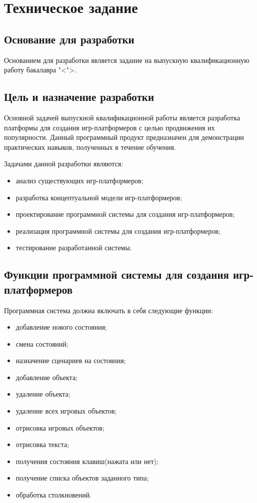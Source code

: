 \section{Техническое задание}
\subsection{Основание для разработки}

Основанием для разработки является задание на выпускную квалификационную работу бакалавра "< ">.

\subsection{Цель и назначение разработки}

Основной задачей выпускной квалификационной работы является разработка платформы для создания игр-платформеров с целью продвижения их популярности. Данный программный продукт предназначен для демонстрации практических навыков, полученных в течение обучения.

Задачами данной разработки являются:
\begin{itemize}
\item анализ существующих игр-платформеров;
\item разработка концептуальной модели игр-платформеров;
\item проектирование программной системы для создания игр-платформеров;
\item реализация программной системы для создания игр-платформеров;
\item тестирование разработанной системы.
\end{itemize}

\subsection{Функции программной системы для создания игр-платформеров}

Программная система должна включать в себя следующие функции:
\begin{itemize}

    \item добавление нового состояния;
    \item смена состояний;
    \item назначение сценариев на состояния;
    \item добавление объекта;
    \item удаление объекта;
    \item удаление всех игровых объектов;
    \item отрисовка игровых объектов;
    \item отрисовка текста;
    \item получения состояния клавиш(нажата или нет);
    \item получение списка объектов заданного типа;
    \item обработка столкновений.
\end{itemize}

